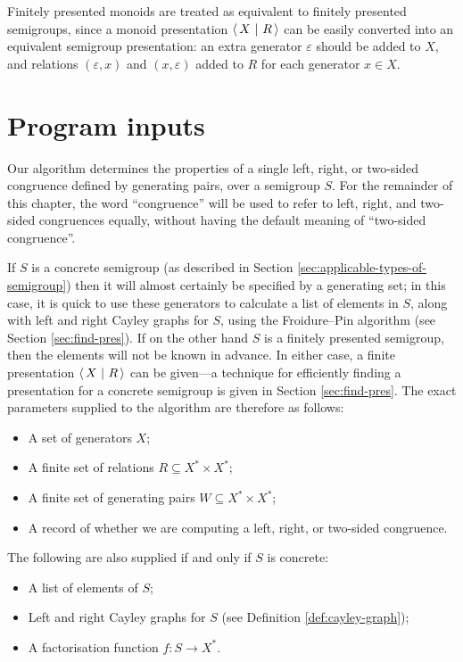 Finitely presented monoids are treated as equivalent to finitely presented
semigroups, since a monoid presentation $\left\langle\,X ~\middle|~ R\,\right\rangle$ can be easily converted into
an equivalent semigroup presentation: an extra generator $\varepsilon$ should be
added to $X$, and relations $(\varepsilon,x)$ and $(x,\varepsilon)$ added to $R$
for each generator $x \in X$.

\section{Program inputs}
\label{sec:program-inputs}

Our algorithm determines the properties of a single left, right, or two-sided
congruence defined by generating pairs, over a semigroup $S$.
For the remainder of this chapter, the word ``congruence'' will be used to refer
to left, right, and two-sided congruences equally, without having the default
meaning of ``two-sided congruence''. %

If $S$ is a concrete semigroup (as described in Section
\ref{sec:applicable-types-of-semigroup}) then it will almost certainly be
specified by a generating set; in this case, it is quick to use these generators
to calculate a list of elements in $S$, along with left and right Cayley graphs
for $S$, using the Froidure--Pin algorithm (see Section \ref{sec:find-pres}).  If on the
other hand $S$ is a finitely presented semigroup, then the elements will not be
known in advance.  In either case, a finite presentation $\left\langle\,X ~\middle|~ R\,\right\rangle$ can be
given---a technique for efficiently finding a presentation for a concrete
semigroup is given in Section \ref{sec:find-pres}.
The exact parameters supplied to the algorithm are therefore as follows:
\begin{itemize}
\item A set of generators $X$;
\item A finite set of relations $R \subseteq X^* \times X^*$;
\item A finite set of generating pairs $W \subseteq X^* \times X^*$;
\item A record of whether we are computing a left, right, or two-sided
  congruence.
\end{itemize}
The following are also supplied if and only if $S$ is concrete:
\begin{itemize}
\item A list of elements of $S$;
\item Left and right Cayley graphs for $S$ (see Definition
  \ref{def:cayley-graph});
\item A factorisation function $f : S \to X^*$.
\end{itemize}

